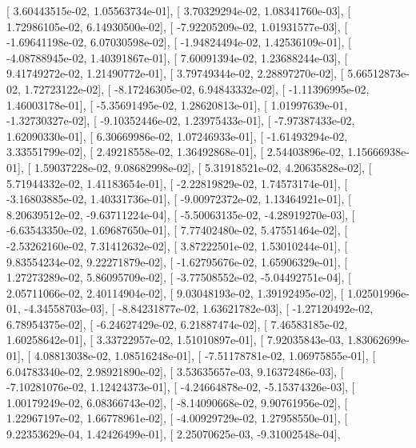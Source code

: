 \documentclass{article}
\begin{document}
       [  3.60443515e-02,   1.05563734e-01],
       [  3.70329294e-02,   1.08341760e-03],
       [  1.72986105e-02,   6.14930500e-02],
       [ -7.92205209e-02,   1.01931577e-03],
       [ -1.69641198e-02,   6.07030598e-02],
       [ -1.94824494e-02,   1.42536109e-01],
       [ -4.08788945e-02,   1.40391867e-01],
       [  7.60091394e-02,   1.23688244e-03],
       [  9.41749272e-02,   1.21490772e-01],
       [  3.79749344e-02,   2.28897270e-02],
       [  5.66512873e-02,   1.72723122e-02],
       [ -8.17246305e-02,   6.94843332e-02],
       [ -1.11396995e-02,   1.46003178e-01],
       [ -5.35691495e-02,   1.28620813e-01],
       [  1.01997639e-01,  -1.32730327e-02],
       [ -9.10352446e-02,   1.23975433e-01],
       [ -7.97387433e-02,   1.62090330e-01],
       [  6.30669986e-02,   1.07246933e-01],
       [ -1.61493294e-02,   3.33551799e-02],
       [  2.49218558e-02,   1.36492868e-01],
       [  2.54403896e-02,   1.15666938e-01],
       [  1.59037228e-02,   9.08682998e-02],
       [  5.31918521e-02,   4.20635828e-02],
       [  5.71944332e-02,   1.41183654e-01],
       [ -2.22819829e-02,   1.74573174e-01],
       [ -3.16803885e-02,   1.40331736e-01],
       [ -9.00972372e-02,   1.13464921e-01],
       [  8.20639512e-02,  -9.63711224e-04],
       [ -5.50063135e-02,  -4.28919270e-03],
       [ -6.63543350e-02,   1.69687650e-01],
       [  7.77402480e-02,   5.47551464e-02],
       [ -2.53262160e-02,   7.31412632e-02],
       [  3.87222501e-02,   1.53010244e-01],
       [  9.83554234e-02,   9.22271879e-02],
       [ -1.62795676e-02,   1.65906329e-01],
       [  1.27273289e-02,   5.86095709e-02],
       [ -3.77508552e-02,  -5.04492751e-04],
       [  2.05711066e-02,   2.40114904e-02],
       [  9.03048193e-02,   1.39192495e-02],
       [  1.02501996e-01,  -4.34558703e-03],
       [ -8.84231877e-02,   1.63621782e-03],
       [ -1.27120492e-02,   6.78954375e-02],
       [ -6.24627429e-02,   6.21887474e-02],
       [  7.46583185e-02,   1.60258642e-01],
       [  3.33722957e-02,   1.51010897e-01],
       [  7.92035843e-03,   1.83062699e-01],
       [  4.08813038e-02,   1.08516248e-01],
       [ -7.51178781e-02,   1.06975855e-01],
       [  6.04783340e-02,   2.98921890e-02],
       [  3.53635657e-03,   9.16372486e-03],
       [ -7.10281076e-02,   1.12424373e-01],
       [ -4.24664878e-02,  -5.15374326e-03],
       [  1.00179249e-02,   6.08366743e-02],
       [ -8.14090668e-02,   9.90761956e-02],
       [  1.22967197e-02,   1.66778961e-02],
       [ -4.00929729e-02,   1.27958550e-01],
       [  9.22353629e-04,   1.42426499e-01],
       [  2.25070625e-03,  -9.31002548e-04],
\end{document}
